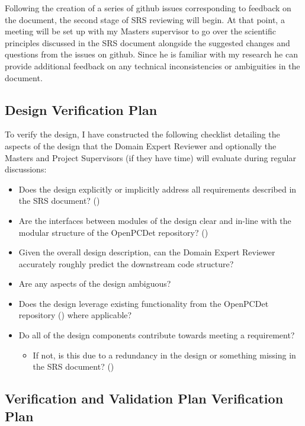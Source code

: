 \documentclass[12pt, titlepage]{article}
\begin{document}
Following the creation of a series of github issues corresponding 
to feedback on the document, the second stage of SRS reviewing will begin. At that point, a meeting 
will be set up with my Masters supervisor to go over the scientific principles discussed in the SRS document 
alongside the suggested changes and questions from the issues on github. Since he is familiar with 
my research he can provide additional feedback on any technical inconsistencies or ambiguities in the document.

\subsection{Design Verification Plan}

To verify the design, I have constructed the following checklist detailing the aspects of the design
that the Domain Expert Reviewer and optionally the Masters and Project Supervisors (if they have time) 
will evaluate during regular discussions:
\begin{itemize}
  \item Does the design explicitly or implicitly address all requirements described in the SRS document? (\cite{SRS})
  \item Are the interfaces between modules of the design clear and in-line with the modular structure of the OpenPCDet repository? (\cite{openpcdet2020})
  \item Given the overall design description, can the Domain Expert Reviewer accurately roughly predict the downstream code structure?
  \item Are any aspects of the design ambiguous?
  \item Does the design leverage existing functionality from the OpenPCDet repository (\cite{openpcdet2020}) where applicable?
  \item Do all of the design components contribute towards meeting a requirement?
  \begin{itemize}
    \item If not, is this due to a redundancy in the design or something missing in the SRS document? (\cite{SRS})
  \end{itemize}
\end{itemize}

\subsection{Verification and Validation Plan Verification Plan}
\end{document}
